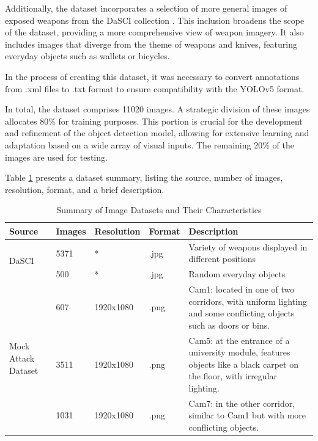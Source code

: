 Additionally, the dataset incorporates a selection of more general images of exposed weapons from the DaSCI collection \cite{rfc29}. This inclusion broadens the scope of the dataset, providing a more comprehensive view of weapon imagery. It also includes images that diverge from the theme of weapons and knives, featuring everyday objects such as wallets or bicycles.

In the process of creating this dataset, it was necessary to convert annotations from .xml files to .txt format to ensure compatibility with the YOLOv5 format.

In total, the dataset comprises 11020 images. A strategic division of these images allocates 80\% for training purposes. This portion is crucial for the development and refinement of the object detection model, allowing for extensive learning and adaptation based on a wide array of visual inputs. The remaining 20\% of the images are used for testing. 

Table \ref{datasets-table} presents a dataset summary, listing the source, number of images, resolution, format, and a brief description.
\begin{table}[ht]
    \centering
    \begin{tabularx}{\textwidth}{|l|l|l|l|X|}
    \hline
    \textbf{Source} & \textbf{Images} & \textbf{Resolution} & \textbf{Format} & \textbf{Description} \\ \hline
    \multirow{2}{*}{DaSCI \cite{rfc29}} & 5371 & * & .jpg & Variety of weapons displayed in different positions \\ \cline{2-5}
        & 500 & * & .jpg & Random everyday objects \\ \hline

    \multirow{3}{*}{\centering Mock Attack Dataset \cite{rfc45}} & 607 & 1920x1080 & .png & 
    Cam1: located in one of two corridors, with uniform lighting and some conflicting objects such as doors or bins. \\ \cline{2-5}
     & 3511 & 1920x1080 & .png & 
    Cam5: at the entrance of a university module, features objects like a black carpet on the floor, with irregular lighting. \\ \cline{2-5}
     & 1031 & 1920x1080 & .png & 
    Cam7: in the other corridor, similar to Cam1 but with more conflicting objects. \\ \hline
    \end{tabularx}
    \caption{Summary of Image Datasets and Their Characteristics}
    \label{datasets-table}
\end{table}

